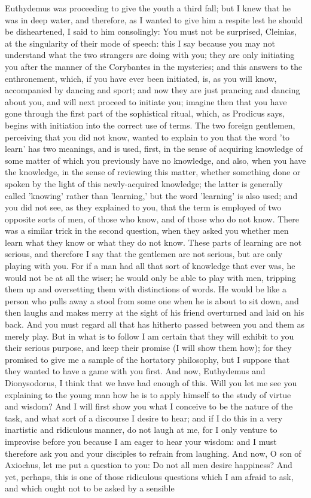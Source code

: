 \documentclass[11pt,letter]{article}
\begin{document}
\par  Euthydemus was proceeding to give the youth a third fall; but I knew that he was in deep water, and therefore, as I wanted to give him a respite lest he should be disheartened, I said to him consolingly: You must not be surprised, Cleinias, at the singularity of their mode of speech: this I say because you may not understand what the two strangers are doing with you; they are only initiating you after the manner of the Corybantes in the mysteries; and this answers to the enthronement, which, if you have ever been initiated, is, as you will know, accompanied by dancing and sport; and now they are just prancing and dancing about you, and will next proceed to initiate you; imagine then that you have gone through the first part of the sophistical ritual, which, as Prodicus says, begins with initiation into the correct use of terms. The two foreign gentlemen, perceiving that you did not know, wanted to explain to you that the word 'to learn' has two meanings, and is used, first, in the sense of acquiring knowledge of some matter of which you previously have no knowledge, and also, when you have the knowledge, in the sense of reviewing this matter, whether something done or spoken by the light of this newly-acquired knowledge; the latter is generally called 'knowing' rather than 'learning,' but the word 'learning' is also used; and you did not see, as they explained to you, that the term is employed of two opposite sorts of men, of those who know, and of those who do not know. There was a similar trick in the second question, when they asked you whether men learn what they know or what they do not know. These parts of learning are not serious, and therefore I say that the gentlemen are not serious, but are only playing with you. For if a man had all that sort of knowledge that ever was, he would not be at all the wiser; he would only be able to play with men, tripping them up and oversetting them with distinctions of words. He would be like a person who pulls away a stool from some one when he is about to sit down, and then laughs and makes merry at the sight of his friend overturned and laid on his back. And you must regard all that has hitherto passed between you and them as merely play. But in what is to follow I am certain that they will exhibit to you their serious purpose, and keep their promise (I will show them how); for they promised to give me a sample of the hortatory philosophy, but I suppose that they wanted to have a game with you first. And now, Euthydemus and Dionysodorus, I think that we have had enough of this. Will you let me see you explaining to the young man how he is to apply himself to the study of virtue and wisdom? And I will first show you what I conceive to be the nature of the task, and what sort of a discourse I desire to hear; and if I do this in a very inartistic and ridiculous manner, do not laugh at me, for I only venture to improvise before you because I am eager to hear your wisdom: and I must therefore ask you and your disciples to refrain from laughing. And now, O son of Axiochus, let me put a question to you: Do not all men desire happiness? And yet, perhaps, this is one of those ridiculous questions which I am afraid to ask, and which ought not to be asked by a sensible 
\end{document}
